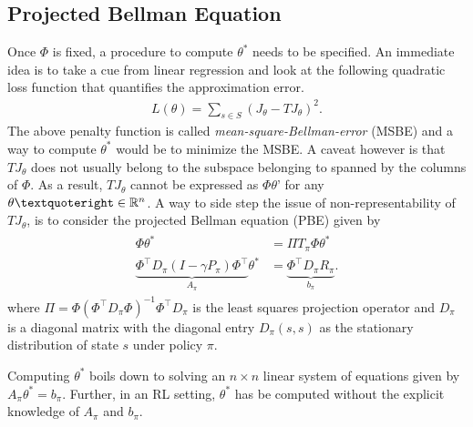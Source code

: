 \subsection{Projected Bellman Equation}
Once $\Phi$ is fixed, a procedure to compute $\theta^*$ needs to be specified. An immediate idea is to take a cue from linear regression and look at the following quadratic loss function that quantifies the approximation error.
\begin{align}
L(\theta)=\sum_{s\in S}(J_\theta-TJ_\theta)^2.
\end{align}
The above penalty function is called \emph{mean-square-Bellman-error} (MSBE) and a way to compute $\theta^*$ would be to minimize the MSBE. A caveat however is that $TJ_\theta$ does not usually belong to the subspace belonging to spanned by the columns of $\Phi$. As a result, $TJ_\theta$ cannot be expressed as $\Phi \theta’$ for any $\theta’\in \R^n$. 
A way to side step the issue of non-representability of $TJ_\theta$, is to consider the projected Bellman equation (PBE) given by
\begin{align}\label{pbe}
\begin{split}
\Phi {\theta^*}&=\Pi T_\pi \Phi{\theta^*}\\
\underbrace{\Phi^\top D_\pi (I-\gamma P_\pi)\Phi^\top}_{A_\pi} \theta^*&=\underbrace{\Phi^\top D_\pi R_\pi}_{b_\pi}.
\end{split}
\end{align}
where $\Pi=\Phi(\Phi^\top D_\pi \Phi)^{-1}\Phi^\top D_\pi$ is the least squares projection operator and $D_\pi$ is a diagonal matrix with the diagonal entry $D_\pi(s,s)$ as the stationary distribution of state $s$ under policy $\pi$.\par
Computing $\theta^*$ boils down to solving an $n\times n $ linear system of equations given by$A_\pi\theta^*=b_\pi$. Further, in an RL setting, $\theta^*$ has be computed without the explicit knowledge of $A_\pi$ and $b_\pi$.
